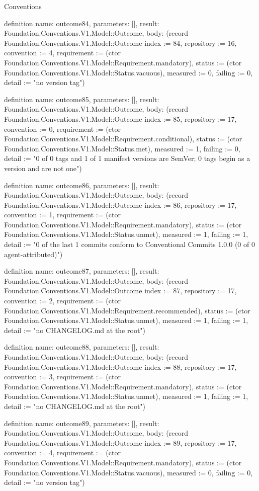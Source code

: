 \begin{lexlean}{Conventions}
\begin{semanticmodule}
definition{
  name: outcome84,
  parameters: [],
  result: Foundation.Conventions.V1.Model::Outcome,
  body: (record Foundation.Conventions.V1.Model::Outcome {index := 84, repository := 16, convention := 4, requirement := (ctor Foundation.Conventions.V1.Model::Requirement.mandatory), status := (ctor Foundation.Conventions.V1.Model::Status.vacuous), measured := 0, failing := 0, detail := "no version tag"})
}

definition{
  name: outcome85,
  parameters: [],
  result: Foundation.Conventions.V1.Model::Outcome,
  body: (record Foundation.Conventions.V1.Model::Outcome {index := 85, repository := 17, convention := 0, requirement := (ctor Foundation.Conventions.V1.Model::Requirement.conditional), status := (ctor Foundation.Conventions.V1.Model::Status.met), measured := 1, failing := 0, detail := "0 of 0 tags and 1 of 1 manifest versions are SemVer; 0 tags begin as a version and are not one"})
}

definition{
  name: outcome86,
  parameters: [],
  result: Foundation.Conventions.V1.Model::Outcome,
  body: (record Foundation.Conventions.V1.Model::Outcome {index := 86, repository := 17, convention := 1, requirement := (ctor Foundation.Conventions.V1.Model::Requirement.mandatory), status := (ctor Foundation.Conventions.V1.Model::Status.unmet), measured := 1, failing := 1, detail := "0 of the last 1 commits conform to Conventional Commits 1.0.0 (0 of 0 agent-attributed)"})
}

definition{
  name: outcome87,
  parameters: [],
  result: Foundation.Conventions.V1.Model::Outcome,
  body: (record Foundation.Conventions.V1.Model::Outcome {index := 87, repository := 17, convention := 2, requirement := (ctor Foundation.Conventions.V1.Model::Requirement.recommended), status := (ctor Foundation.Conventions.V1.Model::Status.unmet), measured := 1, failing := 1, detail := "no CHANGELOG.md at the root"})
}

definition{
  name: outcome88,
  parameters: [],
  result: Foundation.Conventions.V1.Model::Outcome,
  body: (record Foundation.Conventions.V1.Model::Outcome {index := 88, repository := 17, convention := 3, requirement := (ctor Foundation.Conventions.V1.Model::Requirement.mandatory), status := (ctor Foundation.Conventions.V1.Model::Status.unmet), measured := 1, failing := 1, detail := "no CHANGELOG.md at the root"})
}

definition{
  name: outcome89,
  parameters: [],
  result: Foundation.Conventions.V1.Model::Outcome,
  body: (record Foundation.Conventions.V1.Model::Outcome {index := 89, repository := 17, convention := 4, requirement := (ctor Foundation.Conventions.V1.Model::Requirement.mandatory), status := (ctor Foundation.Conventions.V1.Model::Status.vacuous), measured := 0, failing := 0, detail := "no version tag"})
}


\end{semanticmodule}
\end{lexlean}
